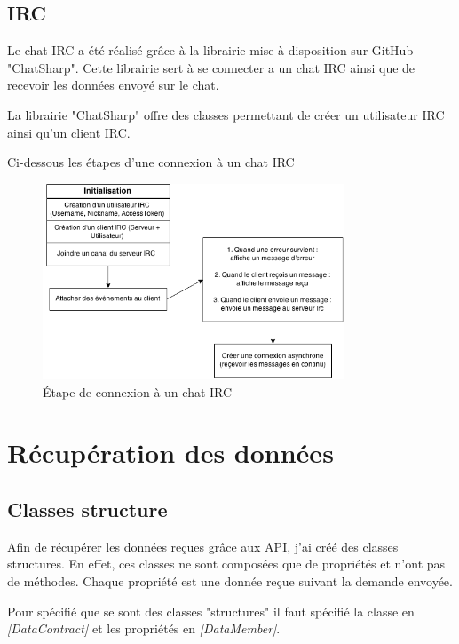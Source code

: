 \documentclass[11pt]{report} %
\begin{document}
		\subsection{IRC}
		Le chat IRC a été réalisé grâce à la librairie mise à disposition sur GitHub "ChatSharp". Cette librairie sert à se connecter a un chat IRC ainsi que de recevoir les données envoyé sur le chat.
		
		La librairie "ChatSharp" offre des classes permettant de créer un utilisateur IRC ainsi qu'un client IRC. 
		
		Ci-dessous les étapes d'une connexion à un chat IRC
		
		\begin{figure}[h]
			\center
			\includegraphics[width=0.8\textwidth]{../img/IrcChat.png}
			\caption{Étape de connexion à un chat IRC}
			\label{IrcChat}
		\end{figure}
		
		
	
	\section{Récupération des données}
		\subsection{Classes structure}
		Afin de récupérer les données reçues grâce aux API, j'ai créé des classes structures. En effet, ces classes ne sont composées que de propriétés et n'ont pas de méthodes. Chaque propriété est une donnée reçue suivant la demande envoyée.
		
		Pour spécifié que se sont des classes "structures" il faut spécifié la classe en \textit{[DataContract]} et les propriétés en \textit{[DataMember]}.
		
\end{document}
